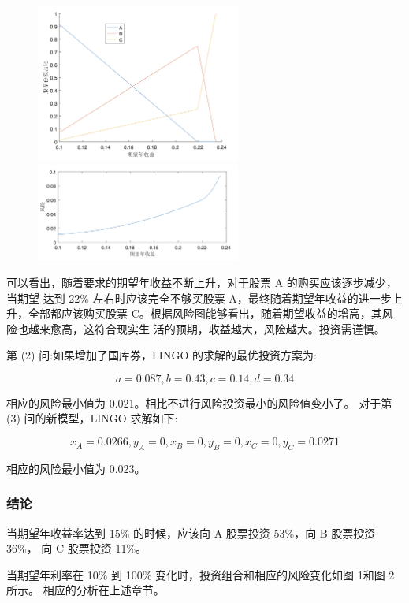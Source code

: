 \documentclass{article}
\begin{document}
\begin{figure}[H]
    \centering
    \includegraphics[width=0.6\textwidth]{pic3.png}
    \includegraphics[width=0.6\textwidth]{pic4.png}

\end{figure}

可以看出，随着要求的期望年收益不断上升，对于股票 A 的购买应该逐步减少，当期望 达到 22\% 左右时应该完全不够买股票 A，最终随着期望年收益的进一步上升，全部都应该购买股票 C。根据风险图能够看出，随着期望收益的增高，其风险也越来愈高，这符合现实生 活的预期，收益越大，风险越大。投资需谨慎。

第 (2) 问:如果增加了国库券，LINGO 的求解的最优投资方案为:


$$a=0.087,b=0.43,c=0.14,d=0.34$$

相应的风险最小值为 0.021。相比不进行风险投资最小的风险值变小了。 对于第 (3) 问的新模型，LINGO 求解如下:

$$x_A=0.0266,y_A=0,x_B=0,y_B=0,x_C=0,y_C=0.0271$$

相应的风险最小值为 0.023。

\subsubsection{结论}

当期望年收益率达到 15\% 的时候，应该向 A 股票投资 53\%，向 B 股票投资 36\%， 向 C 股票投资 11\%。


当期望年利率在 10\% 到 100\% 变化时，投资组合和相应的风险变化如图 1和图 2所示。 相应的分析在上述章节。
\end{document}
